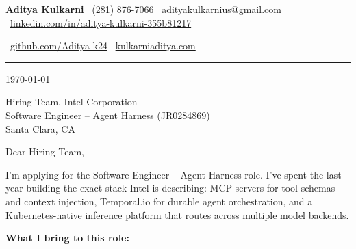 \documentclass[11pt]{article}
\begin{document}
{\large\textbf{Aditya Kulkarni}} \hfill
{\small
  \textcolor{accent}{\faPhone}\ (281) 876-7066 \quad
  \textcolor{accent}{\faEnvelope}\ adityakulkarnius@gmail.com \quad
  \textcolor{accent}{\faLinkedin}\ \href{https://linkedin.com/in/aditya-kulkarni-355b81217}{linkedin.com/in/aditya-kulkarni-355b81217}
}

{\small
  \textcolor{accent}{\faGithub}\ \href{https://github.com/Aditya-k24}{github.com/Aditya-k24} \quad
  \textcolor{accent}{\faGlobe}\ \href{https://kulkarniaditya.com}{kulkarniaditya.com}
}

\vspace{4pt}
\textcolor{accent}{\rule{\linewidth}{0.5pt}}
\vspace{8pt}

\today

\vspace{8pt}
Hiring Team, Intel Corporation\\
Software Engineer -- Agent Harness (JR0284869)\\
Santa Clara, CA

\vspace{10pt}
Dear Hiring Team,

\vspace{8pt}
I'm applying for the Software Engineer -- Agent Harness role. I've spent the last year building the exact stack Intel is describing: MCP servers for tool schemas and context injection, Temporal.io for durable agent orchestration, and a Kubernetes-native inference platform that routes across multiple model backends.

\vspace{8pt}
\textbf{What I bring to this role:}
\end{document}
